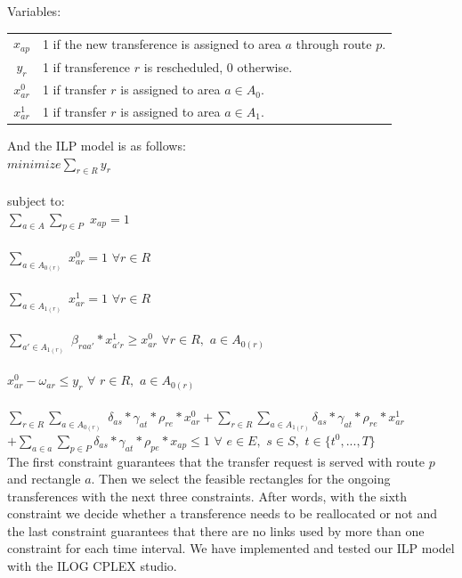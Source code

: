 \documentclass[11pt,a4paper]{article}
\begin{document}
Variables:
\begin{table}[H]
\small
\begin{tabular}{c l}
$x_{ap}$ & 1 if the new transference is assigned to area $a$ through route $p$.\\
$y_{r}$ & 1 if transference $r$ is rescheduled, 0 otherwise.\\
$x^{0}_{ar}$ & 1 if transfer $r$ is assigned to area $a \in A_{0}$.\\
$x^{1}_{ar}$ & 1 if transfer $r$ is assigned to area $a \in A_{1}$.\\
\end{tabular}
\end{table}
And the ILP model is as follows:\\
$minimize \sum_{r\in R} y_{r} $\\\\
subject to:\\
$\sum_{a \in A} \sum_{p \in P}$ $x_{ap} = 1$\\\\
$\sum_{a \in A_{0(r)}}$ $x^{0}_{ar}=1$    $\forall r \in R$\\\\
$\sum_{a \in A_{1(r)}}$ $x^{1}_{ar}=1$    $\forall r \in R$\\\\
$\sum_{a' \in A_{1(r)}}$ $\beta_{raa'}*x^{1}_{a'r} \geq x^{0}_{ar}$     $\forall r \in R,$ $a \in A_{0(r)}$\\\\
$x^{0}_{ar} - \omega_{ar} \leq y_{r}$     $\forall$ $r \in R,$ $a \in A_{0(r)}$\\\\
$\sum_{r \in R} \sum_{a \in A_{0(r)}}$ $\delta_{as} * \gamma_{at} * \rho_{re} * x^{0}_{ar} + \sum_{r \in R} \sum_{a \in A_{1(r)}} \delta_{as} * \gamma_{at} * \rho_{re} * x^{1}_{ar}$\\ 
$+ \sum_{a \in a} \sum_{p \in P} \delta_{as} * \gamma_{at} * \rho_{pe} * x_{ap} \leq 1$    $\forall$ $e \in E,$ $s \in S,$ $t \in {\{t^{0},...,T\}}$\\

The first constraint guarantees that the transfer request is served with route $p$ and rectangle $a$. Then we select the feasible rectangles for the ongoing transferences with the next three constraints. After words, with the sixth constraint we decide whether a transference needs to be reallocated or not and the last constraint guarantees that there are no links used by more than one constraint for each time interval. We have implemented and tested our ILP model with the ILOG CPLEX studio.
\end{document}
